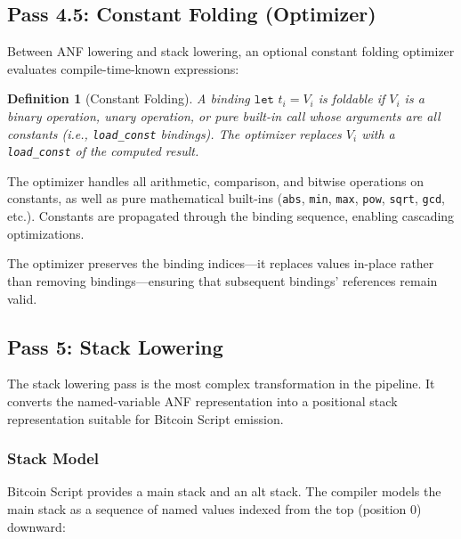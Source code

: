 \documentclass[11pt,a4paper]{article}
\newtheorem{definition}[theorem]{Definition}
\begin{document}
\subsection{Pass 4.5: Constant Folding (Optimizer)}
\label{sec:pass-optimize}

Between ANF lowering and stack lowering, an optional constant folding
optimizer evaluates compile-time-known expressions:

\begin{definition}[Constant Folding]
A binding $\texttt{let } t_i = V_i$ is \emph{foldable} if $V_i$ is a
binary operation, unary operation, or pure built-in call whose arguments
are all constants (i.e., \texttt{load\_const} bindings). The optimizer
replaces $V_i$ with a \texttt{load\_const} of the computed result.
\end{definition}

The optimizer handles all arithmetic, comparison, and bitwise operations on
constants, as well as pure mathematical built-ins (\texttt{abs}, \texttt{min},
\texttt{max}, \texttt{pow}, \texttt{sqrt}, \texttt{gcd}, etc.). Constants
are propagated through the binding sequence, enabling cascading optimizations.

The optimizer preserves the binding indices---it replaces values in-place
rather than removing bindings---ensuring that subsequent bindings' references
remain valid.

\subsection{Pass 5: Stack Lowering}
\label{sec:pass-stack}

The stack lowering pass is the most complex transformation in the pipeline.
It converts the named-variable ANF representation into a positional stack
representation suitable for Bitcoin Script emission.

\subsubsection{Stack Model}

Bitcoin Script provides a main stack and an alt stack. The compiler models
the main stack as a sequence of named values indexed from the top
(position 0) downward:
\end{document}
